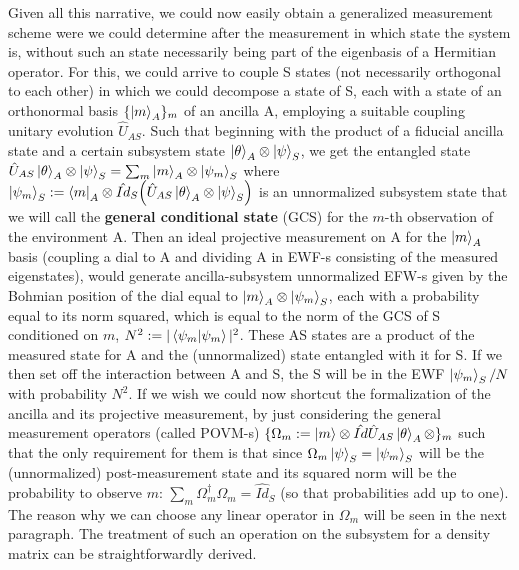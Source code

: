 \documentclass[11pt, a4paper]{article} %
\begin{document}
Given all this narrative, we could now easily obtain a generalized measurement scheme were we could determine after the measurement in which state the system is, without such an state necessarily being part of the eigenbasis of a Hermitian operator. For this, we could arrive to couple S states (not necessarily orthogonal to each other) in which we could decompose a state of S, each with a state of an orthonormal basis $\{\ket{m}_A\}_m$ of an ancilla A, employing a suitable coupling unitary evolution $\hat{U}_{AS}$. Such that beginning with the product of a fiducial ancilla state and a certain subsystem state $\ket{\theta}_A\otimes\ket{\psi}_S$, we get the entangled state $\hat{U}_{AS}\ket{\theta}_A\otimes\ket{\psi}_S=\sum_m \ket{m}_A\otimes \ket{\psi_m}_S$ where $\ket{\psi_m}_S:=\bra{m}_A\otimes\hat{Id}_S \qty(\hat{U}_{AS}\ket{\theta}_A\otimes\ket{\psi}_S)$ is an unnormalized subsystem state that we will call the {\bf general conditional state} (GCS) for the $m$-th observation of the environment A. Then an ideal projective measurement on A for the $\ket{m}_A$ basis (coupling a dial to A and dividing A in EWF-s consisting of the measured eigenstates), would generate ancilla-subsystem unnormalized EFW-s given by the Bohmian position of the dial equal to $\ket{m}_A\otimes \ket{\psi_m}_S$, each with a probability equal to its norm squared, which is equal to the norm of the GCS of S conditioned on $m$, $N^2:=|\bra{\psi_m}\ket{\psi_m}|^2$. These AS states are a product of the measured state for A and the (unnormalized) state entangled with it for S. If we then set off the interaction between A and S, the S will be in the EWF $\ket{\psi_m}_S/N$ with probability $N^2$. If we wish we could now shortcut the formalization of the ancilla and its projective measurement, by just considering the general measurement operators (called POVM-s) $\{\Omega_m:=\ket{m}\otimes\hat{Id}\hat{U}_{AS}\ket{\theta}_A\otimes\}_m$ such that the only requirement for them is that since $\Omega_m\ket{\psi}_S=\ket{\psi_m}_S$ will be the (unnormalized) post-measurement state and its squared norm will be the probability to observe $m$: $\sum_m \Omega_m^\dagger\Omega_m=\hat{Id}_S$ (so that probabilities add up to one). The reason why we can choose any linear operator in $\Omega_m$ will be seen in the next paragraph. The treatment of such an operation on the subsystem for a density matrix can be straightforwardly derived.
\end{document}

